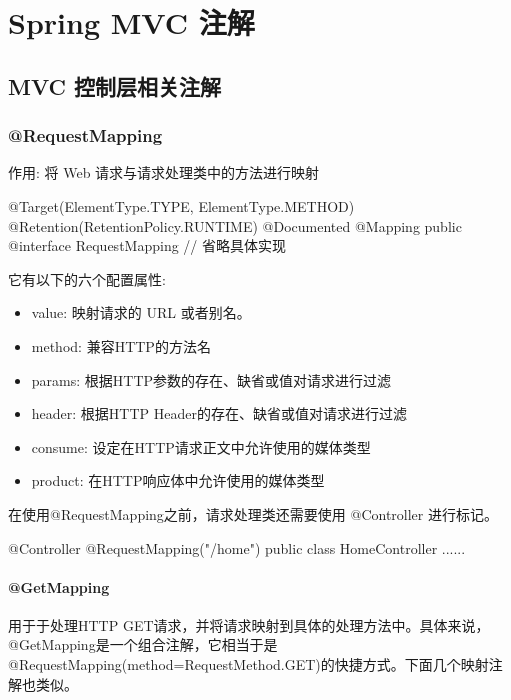 \section{Spring MVC 注解}

\subsection{MVC 控制层相关注解}

\subsubsection{@RequestMapping}

作用: 将 Web 请求与请求处理类中的方法进行映射

\begin{Java}
@Target({ElementType.TYPE, ElementType.METHOD})
@Retention(RetentionPolicy.RUNTIME)
@Documented
@Mapping
public @interface RequestMapping {
    // 省略具体实现
}
\end{Java}

它有以下的六个配置属性:
\begin{itemize}
    \item value: 映射请求的 URL 或者别名。
    \item method: 兼容HTTP的方法名
    \item params: 根据HTTP参数的存在、缺省或值对请求进行过滤
    \item header: 根据HTTP Header的存在、缺省或值对请求进行过滤
    \item consume: 设定在HTTP请求正文中允许使用的媒体类型
    \item product: 在HTTP响应体中允许使用的媒体类型
\end{itemize}

在使用@RequestMapping之前，请求处理类还需要使用 @Controller 进行标记。

\begin{Java}
@Controller
@RequestMapping("/home")
public class HomeController {
    ......
}
\end{Java}

\paragraph*{@GetMapping}

用于于处理HTTP GET请求，并将请求映射到具体的处理方法中。具体来说，@GetMapping是一个组合注解，它相当于是@RequestMapping(method=RequestMethod.GET)的快捷方式。下面几个映射注解也类似。

